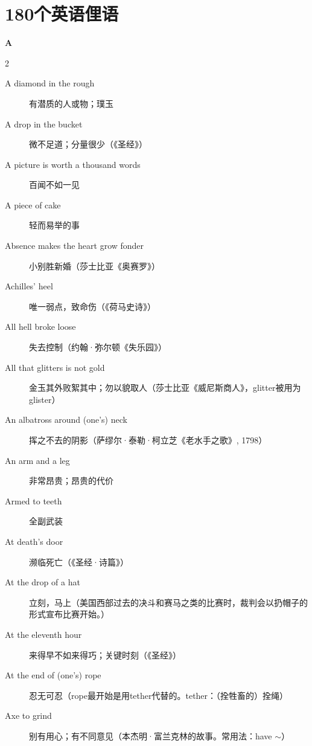 
\section{180个英语俚语}

\begin{center}
  \textbf{A}
\end{center}

\begin{multicols}{2}
  \setlength{\columnseprule}{0.4pt}
  \begin{description}%
    \item[A diamond in the rough] 有潜质的人或物；璞玉
    \item[A drop in the bucket] 微不足道；分量很少（{\fzxk 《圣经》}）
    \item[A picture is worth a thousand words] 百闻不如一见
    \item[A piece of cake] 轻而易举的事
    \item[Absence makes the heart grow fonder] 小别胜新婚（{\fzxk 莎士比亚《奥赛罗》}）
    \item[Achilles' heel] 唯一弱点，致命伤（{\fzxk 《荷马史诗》}）
    \item[All hell broke loose] 失去控制（{\fzxk 约翰·弥尔顿《失乐园》}）
    \item[All that glitters is not gold] 金玉其外败絮其中；勿以貌取人（{\fzxk 莎士比亚《威尼斯商人》，glitter被用为glister}）
    \item[An albatross around (one's) neck] 挥之不去的阴影（{\fzxk 萨缪尔·泰勒·柯立芝《老水手之歌》, 1798}）
    \item[An arm and a leg] 非常昂贵；昂贵的代价
    \item[Armed to teeth] 全副武装
    \item[At death's door] 濒临死亡（{\fzxk 《圣经·诗篇》}）
    \item[At the drop of a hat] 立刻，马上（{\fzxk 美国西部过去的决斗和赛马之类的比赛时，裁判会以扔帽子的形式宣布比赛开始。}）
    \item[At the eleventh hour] 来得早不如来得巧；关键时刻（{\fzxk 《圣经》}）
    \item[At the end of (one's) rope] 忍无可忍（{\fzxk rope最开始是用tether代替的。tether：（拴牲畜的）拴绳}）
    \item[Axe to grind] 别有用心；有不同意见（{\fzxk 本杰明·富兰克林的故事。常用法：have \(\sim\)}）
  \end{description}
\end{multicols}

